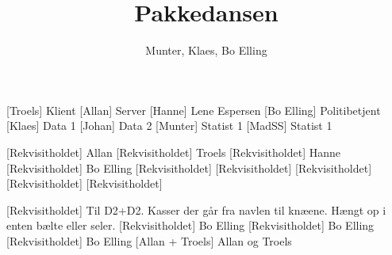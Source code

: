 \documentclass[a4paper,11pt]{article}
\title{Pakkedansen}
\author{Munter, Klaes, Bo Elling}
\begin{document}
\maketitle

\begin{roles}
[Troels] Klient
[Allan] Server
[Hanne] Lene Espersen
[Bo Elling] Politibetjent
[Klaes] Data 1
[Johan] Data 2
[Munter] Statist 1
[MadSS] Statist 1
\end{roles}

\begin{props}
[Rekvisitholdet] Allan
[Rekvisitholdet] Troels
[Rekvisitholdet] Hanne
[Rekvisitholdet] Bo Elling
[Rekvisitholdet]
[Rekvisitholdet]
[Rekvisitholdet]
[Rekvisitholdet]
[Rekvisitholdet]

[Rekvisitholdet] Til D2+D2. Kasser der går fra navlen til knæene. Hængt op i enten bælte eller 
seler.
[Rekvisitholdet] Bo Elling
[Rekvisitholdet] Bo Elling
[Rekvisitholdet] Bo Elling
[Allan + Troels] Allan og Troels
\end{props}
\end{document}
